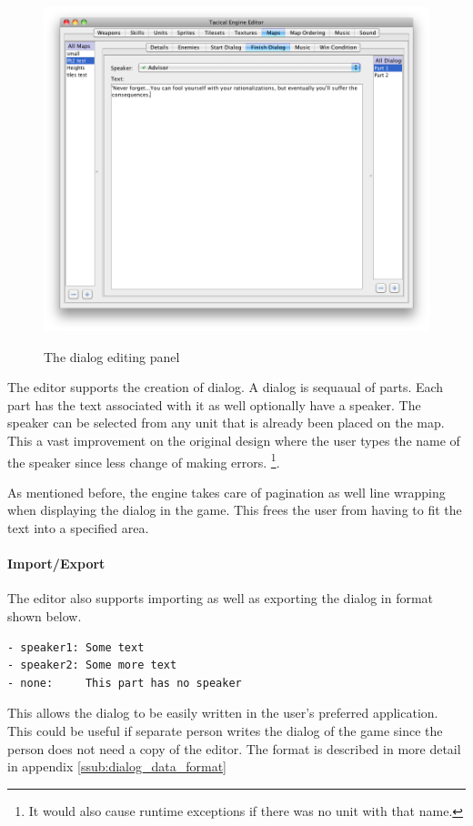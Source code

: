 \begin{figure}[htbp]
	\centering
		\includegraphics[height=4in]{figures/editor/Maps-dialog.png}
	\caption{The dialog editing panel}
	\label{fig:figures_editor_Maps-dialog}
\end{figure}
The editor supports the creation of dialog.  A dialog is sequaual of parts. Each part has the text  associated with it as well optionally have a speaker.  The speaker can be selected from any unit that is already been placed on the map. This a vast improvement on the original design where the user types the name of the speaker since less change of making errors. \footnote{It would also cause runtime exceptions if there was no unit with that name.}.

As mentioned before, the engine takes care of pagination as well line wrapping when displaying the dialog in the game. This frees the user from having to fit the text into a specified area. 

\paragraph{Import/Export\\}
The editor also supports importing as well as exporting the dialog in format shown below. 
\begin{lstlisting}[caption=Shows the format used  for the dialog]
- speaker1: Some text 
- speaker2: Some more text
- none:     This part has no speaker
\end{lstlisting}
This allows the dialog to be easily written in the user's preferred application.  This could be useful if separate person writes the dialog of the game since the person does not need a copy of the editor. The format is described in more detail in appendix \ref{ssub:dialog_data_format}  



